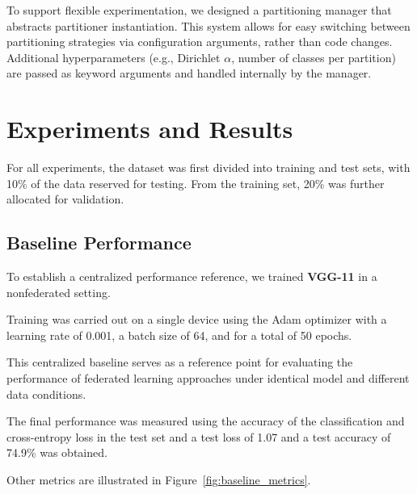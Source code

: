 \documentclass[11pt]{article}
\begin{document}
    To support flexible experimentation, we designed a partitioning manager that abstracts partitioner instantiation.
    This system allows for easy switching between partitioning strategies via configuration arguments, rather than code changes.
    Additional hyperparameters (e.g., Dirichlet \(\alpha\), number of classes per partition) are passed as keyword arguments and handled internally by the manager.


    \section{Experiments and Results}

    For all experiments, the dataset was first divided into training and test sets, with 10\% of the data reserved for testing. From the training set, 20\% was further allocated for validation.

    \subsection{Baseline Performance}
    \label{subsec:baseline_results}

    To establish a centralized performance reference, we trained \textbf{VGG-11} in a nonfederated setting.

    Training was carried out on a single device using the Adam optimizer with a learning rate of 0.001, a batch size of 64, and for a total of 50 epochs.

    This centralized baseline serves as a reference point for evaluating the performance of federated learning approaches under identical model and different data conditions.

    The final performance was measured using the accuracy of the classification and cross-entropy loss in the test set and a test loss of 1.07 and a test accuracy of 74.9\% was obtained.

    Other metrics are illustrated in Figure~\ref{fig:baseline_metrics}.
\end{document}
